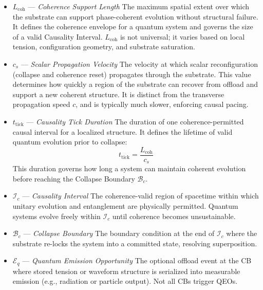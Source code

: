 \documentclass[entropy,article,submit,pdftex,moreauthors]{Definitions/mdpi}
\begin{document}
\begin{itemize}
  \item \textbf{\( L_{\text{coh}} \)} — \textit{Coherence Support Length}  
  The maximum spatial extent over which the substrate can support phase-coherent evolution without structural failure. It defines the coherence envelope for a quantum system and governs the size of a valid Causality Interval. \( L_{\text{coh}} \) is not universal; it varies based on local tension, configuration geometry, and substrate saturation.

  \item \textbf{\( c_s \)} — \textit{Scalar Propagation Velocity}  
  The velocity at which scalar reconfiguration (collapse and coherence reset) propagates through the substrate. This value determines how quickly a region of the substrate can recover from offload and support a new coherent structure. It is distinct from the transverse propagation speed \( c \), and is typically much slower, enforcing causal pacing.

  \item \textbf{\( t_{\text{tick}} \)} — \textit{Causality Tick Duration}  
  The duration of one coherence-permitted causal interval for a localized structure. It defines the lifetime of valid quantum evolution prior to collapse:
  \[
  t_{\text{tick}} = \frac{L_{\text{coh}}}{c_s}
  \]
  This duration governs how long a system can maintain coherent evolution before reaching the Collapse Boundary \( \mathcal{B}_c \).

  \item \textbf{\( \mathcal{I}_c \)} — \textit{Causality Interval}  
  The coherence-valid region of spacetime within which unitary evolution and entanglement are physically permitted. Quantum systems evolve freely within \( \mathcal{I}_c \) until coherence becomes unsustainable.

  \item \textbf{\( \mathcal{B}_c \)} — \textit{Collapse Boundary}  
  The boundary condition at the end of \( \mathcal{I}_c \) where the substrate re-locks the system into a committed state, resolving superposition.

  \item \textbf{\( \mathcal{E}_q \)} — \textit{Quantum Emission Opportunity}  
  The optional offload event at the CB where stored tension or waveform structure is serialized into measurable emission (e.g., radiation or particle output). Not all CBs trigger QEOs.

\end{itemize}
\end{document}
